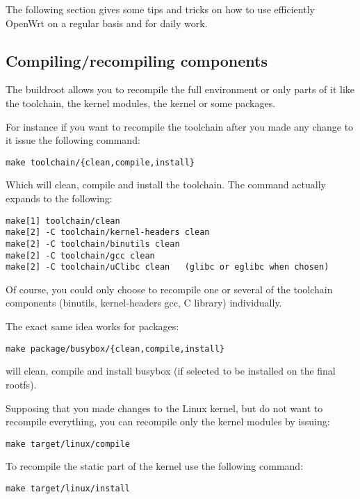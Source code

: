The following section gives some tips and tricks on how to use efficiently
OpenWrt on a regular basis and for daily work.

\subsection{Compiling/recompiling components}

The buildroot allows you to recompile the full environment or only parts of it
like the toolchain, the kernel modules, the kernel or some packages.

For instance if you want to recompile the toolchain after you made any change to it
issue the following command:

\begin{Verbatim}
make toolchain/{clean,compile,install}
\end{Verbatim}

Which will clean, compile and install the toolchain. The command actually expands to the
following:

\begin{Verbatim}
make[1] toolchain/clean
make[2] -C toolchain/kernel-headers clean
make[2] -C toolchain/binutils clean
make[2] -C toolchain/gcc clean
make[2] -C toolchain/uClibc clean	(glibc or eglibc when chosen)
\end{Verbatim}

Of course, you could only choose to recompile one or several of the toolchain components
(binutils, kernel-headers gcc, C library) individually.

The exact same idea works for packages:

\begin{Verbatim}
make package/busybox/{clean,compile,install}
\end{Verbatim}

will clean, compile and install busybox (if selected to be installed on the final rootfs).

Supposing that you made changes to the Linux kernel, but do not want to recompile everything,
you can recompile only the kernel modules by issuing:

\begin{Verbatim}
make target/linux/compile
\end{Verbatim}

To recompile the static part of the kernel use the following command:

\begin{Verbatim}
make target/linux/install
\end{Verbatim}

